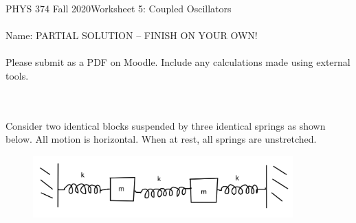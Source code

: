\documentclass[12pt]{article}
\newcommand{\purple}[1]{{\color{purple} #1}}
\begin{document}
PHYS 374 Fall 2020\hfill Worksheet 5: Coupled Oscillators\\
\\
Name: \purple{PARTIAL SOLUTION -- FINISH ON YOUR OWN!}\\
\\
Please submit as a PDF on Moodle. Include any calculations made using external tools.

\hrulefill
\\
\\
Consider two identical blocks suspended by three identical springs as shown below. All motion is horizontal. When at rest, all springs are unstretched. 
\begin{figure}[h]
\includegraphics[width=10cm]{coupled-oscillators.png}
\centering
\end{figure}
\end{document}
